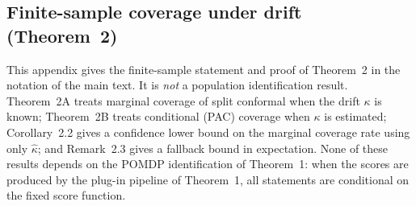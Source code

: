 %
%

\newtheorem*{aIIIthmA}{Theorem 2A}
\newtheorem*{aIIIthmB}{Theorem 2B}
\newtheorem*{aIIIcorA}{Corollary 2.1}
\newtheorem*{aIIIcorB}{Corollary 2.2}
\newtheorem*{aIIIlemA}{Lemma 1}
\newtheorem*{aIIIlemB}{Lemma 2}
\newtheorem*{aIIIlemC}{Lemma 3}
\newtheorem*{aIIIremA}{Remark 2.1}
\newtheorem*{aIIIremB}{Remark 2.2}
\newtheorem*{aIIIremC}{Remark 2.3}
\newtheorem*{aIIIremD}{Remark 3.1}

\providecommand{\theHequation}{}
\let\aIIItheHequation\theHequation
{}
\renewcommand{\theHequation}{aIII.\arabic{aIIIanchor}}
\newcommand{\aIIIfixedtag}[1]{\stepcounter{aIIIanchor}\tag{#1}}

\subsection{Finite-sample coverage under drift (Theorem~2)}\label{app:a3}

This appendix gives the finite-sample statement and proof of Theorem~2 in the
notation of the main text. It is \emph{not} a population
identification result. Theorem~2A treats marginal coverage of split conformal when
the drift $\kappa$ is known; Theorem~2B treats conditional (PAC) coverage when
$\kappa$ is estimated; Corollary~2.2 gives a confidence lower bound on the marginal
coverage rate using only $\hat\kappa$; and Remark~2.3 gives a fallback bound in
expectation. None of these results depends on the POMDP identification of
Theorem~1: when the scores are produced by the plug-in pipeline of Theorem~1, all
statements are conditional on the fixed score function.

